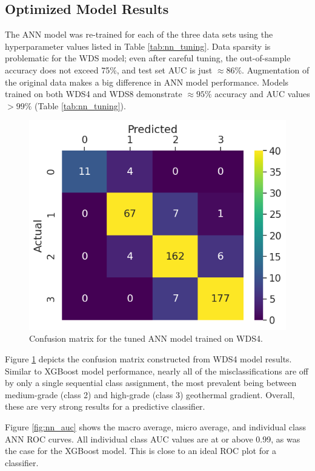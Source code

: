 \subsection{Optimized Model Results}\label{ch5:nn_final_results}
The ANN model was re-trained for each of the three data sets using the hyperparameter values listed in Table \ref{tab:nn_tuning}. Data sparsity is problematic for the WDS model; even after careful tuning, the out-of-sample accuracy does not exceed 75\%, and test set AUC is just $\approx86\%$. Augmentation of the original data makes a big difference in ANN model performance. Models trained on both WDS4 and WDS8 demonstrate $\approx95\%$ accuracy and AUC values $>99\%$ (Table \ref{tab:nn_tuning}).
 
\begin{figure}[htp]
\centering
\includegraphics[width=.5\textwidth]{templates/images/Figure-NN-ConfusionMatrix_WDS4.png}
\singlespacing
\caption[Neural network confusion matrix]{Confusion matrix for the tuned ANN model trained on WDS4.}
\label{fig:nn_confusion_matrix}
\end{figure}

Figure \ref{fig:nn_confusion_matrix} depicts the confusion matrix constructed from WDS4 model results. Similar to XGBoost model performance, nearly all of the misclassifications are off by only a single sequential class assignment, the most prevalent being between medium-grade (class 2) and high-grade (class 3) geothermal gradient. Overall, these are very strong results for a predictive classifier.

Figure \ref{fig:nn_auc} shows the macro average, micro average, and individual class ANN ROC curves. All individual class AUC values are at or above 0.99, as was the case for the XGBoost model. This is close to an ideal ROC plot for a classifier.

